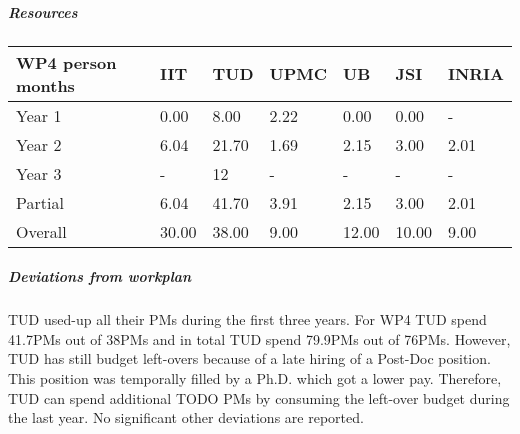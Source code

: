 
\subparagraph{Resources}

\begin{center}
\begin{tabular}{|C{1.5cm}|C{1.5cm}|C{1.5cm}|C{2cm}|C{2cm}|C{2cm}|C{2cm}|}
\hline
\footnotesize \textbf{WP4 person months}& \footnotesize \textbf{IIT}&\footnotesize \textbf{TUD}&\footnotesize \textbf{UPMC}& \footnotesize \textbf{UB} &\footnotesize \textbf{JSI} &\footnotesize \textbf{INRIA}\\ \hline
\footnotesize Year 1 &  0.00 & 8.00 & 2.22 & 0.00 & 0.00 & -     \\  \hline
\footnotesize Year 2 &  6.04 & 21.70 & 1.69 & 2.15 & 3.00 & 2.01     \\  \hline
\footnotesize Year 3 &  -    & 12    & -    & -    & -    & -     \\  \hline
\footnotesize Partial &  6.04 & 41.70 & 3.91 & 2.15 & 3.00 & 2.01 \\ \hline \hline
\footnotesize Overall &  30.00 & 38.00 & 9.00 & 12.00 & 10.00 & 9.00 \\ \hline
\end{tabular}
\end{center}

\subparagraph{Deviations from workplan} 
TUD used-up all their PMs during the first three years. For WP4 TUD spend 41.7PMs out of 38PMs and in total TUD spend 79.9PMs out of 76PMs. However, TUD has still budget left-overs because of a late hiring of a Post-Doc position. This position was temporally filled by a Ph.D. which got a lower pay. Therefore, TUD can spend additional TODO PMs by consuming the left-over budget during the last year. No significant other deviations are reported. 
